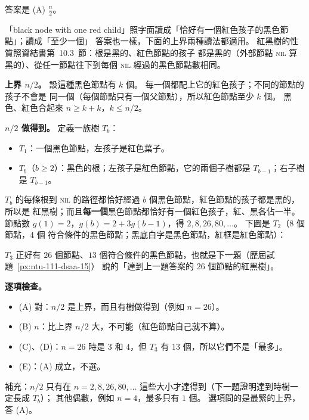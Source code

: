 \begin{pastsoln}
答案是 (A) $\frac{n}{2}$。

「black node with one red child」照字面讀成「恰好有一個紅色孩子的黑色節點」；讀成「至少一個」
答案也一樣，下面的上界兩種讀法都適用。 紅黑樹的性質照資結書第~10.3~節：根是黑的、紅色節點的孩子
都是黑的（外部節點 \textsc{nil} 算黑的）、從任一節點往下到每個 \textsc{nil} 經過的黑色節點數相同。

\textbf{上界 $n/2$。} 設這種黑色節點有 $k$ 個。 每一個都配上它的紅色孩子；不同的節點的孩子不會是
同一個（每個節點只有一個父節點），所以紅色節點至少 $k$ 個。 黑色、紅色合起來
$n \ge k + k$，$k \le n/2$。

\textbf{$n/2$ 做得到。} 定義一族樹 $T_b$：
\begin{itemize}
\item $T_1$：一個黑色節點，左孩子是紅色葉子。
\item $T_b$（$b \ge 2$）：黑色的根；左孩子是紅色節點，它的兩個子樹都是 $T_{b-1}$；右子樹是
$T_{b-1}$。
\end{itemize}
$T_b$ 的每條根到 \textsc{nil} 的路徑都恰好經過 $b$ 個黑色節點，紅色節點的孩子都是黑的，所以是
紅黑樹；而且\textbf{每一個}黑色節點都恰好有一個紅色孩子，紅、黑各佔一半。 節點數
$g(1) = 2$，$g(b) = 2 + 3g(b-1)$，得 $2, 8, 26, 80, \ldots$。 下圖是 $T_2$（$8$ 個節點，$4$ 個
符合條件的黑色節點；黑底白字是黑色節點，紅框是紅色節點）：
\begin{center}
\end{center}
$T_3$ 正好有 $26$ 個節點、$13$ 個符合條件的黑色節點，也就是下一題（歷屆試題~\ref{px:ntu-111-dsaa-15}）
說的「達到上一題答案的 $26$ 個節點的紅黑樹」。

\textbf{逐項檢查。}
\begin{itemize}
\item (A) 對：$n/2$ 是上界，而且有樹做得到（例如 $n = 26$）。
\item (B) $n$：比上界 $n/2$ 大，不可能（紅色節點自己就不算）。
\item (C)、(D)：$n = 26$ 時是 $3$ 和 $4$，但 $T_3$ 有 $13$ 個，所以它們不是「最多」。
\item (E)：(A) 成立，不選。
\end{itemize}
補充：$n/2$ 只有在 $n = 2, 8, 26, 80, \ldots$ 這些大小才達得到（下一題證明達到時樹一定長成 $T_b$）；
其他偶數，例如 $n = 4$，最多只有 $1$ 個。 選項問的是最緊的上界，答 (A)。
\end{pastsoln}
